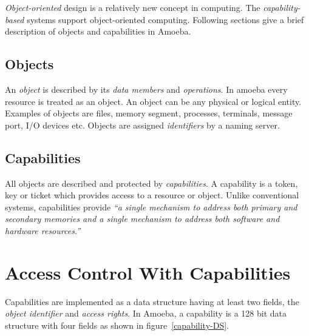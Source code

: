 \documentclass[11pt,a4paper]{article}
\begin{document}
\emph{Object-oriented} design is a relatively new concept in computing. The \emph{capability-based} systems support object-oriented computing. Following sections give a brief description of objects and capabilities in Amoeba.

\subsection{Objects}

An \emph{object} is described by its \emph{data members} and \emph{operations}. In amoeba every resource is treated as an object. An object can be any physical or logical entity. Examples of objects are files, memory segment, processes, terminals, message port, I/O devices etc. Objects are assigned \emph{identifiers} by a naming server.

\subsection{Capabilities}

All objects are described and protected by \emph{capabilities}. A capability is a token, key or ticket which provides access to a resource or object. Unlike conventional systems, capabilities provide \emph{``a single mechanism to address both primary and secondary memories and a single mechanism to address both software and hardware resources.''}~\cite[p.~3]{capability-based-systems-levy}

\section{Access Control With Capabilities}

Capabilities are implemented as a data structure having at least two fields, the \emph{object identifier} and \emph{access rights}. In Amoeba, a capability is a 128 bit data structure with four fields as shown in figure~\ref{capability-DS}.
\end{document}
